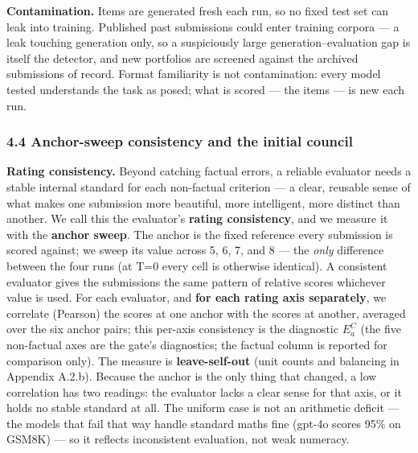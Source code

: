 \textbf{Contamination.} Items are generated fresh each run, so no fixed test set can leak into training. Published past submissions could enter training corpora --- a leak touching generation only, so a suspiciously large generation--evaluation gap is itself the detector, and new portfolios are screened against the archived submissions of record. Format familiarity is not contamination: every model tested understands the task as posed; what is scored --- the items --- is new each run.

\subsubsection{4.4 Anchor-sweep consistency and the initial council}\label{anchor-sweep-consistency-and-the-initial-council}

\textbf{Rating consistency.} Beyond catching factual errors, a reliable evaluator needs a stable internal standard for each non-factual criterion --- a clear, reusable sense of what makes one submission more beautiful, more intelligent, more distinct than another. We call this the evaluator's \textbf{rating consistency}, and we measure it with the \textbf{anchor sweep}. The anchor is the fixed reference every submission is scored against; we sweep its value across 5, 6, 7, and 8 --- the \emph{only} difference between the four runs (at T=0 every cell is otherwise identical). A consistent evaluator gives the submissions the same pattern of relative scores whichever value is used. For each evaluator, and \textbf{for each rating axis separately}, we correlate (Pearson) the scores at one anchor with the scores at another, averaged over the six anchor pairs; this per-axis consistency is the diagnostic \(E^{C}_a\) (the five non-factual axes are the gate's diagnostics; the factual column is reported for comparison only). The measure is \textbf{leave-self-out} (unit counts and balancing in Appendix A.2.b). Because the anchor is the only thing that changed, a low correlation has two readings: the evaluator lacks a clear sense for that axis, or it holds no stable standard at all. The uniform case is not an arithmetic deficit --- the models that fail that way handle standard maths fine (gpt-4o scores 95\% on GSM8K) --- so it reflects inconsistent evaluation, not weak numeracy.

\protect{}\label{tab-criterion-b}{}

